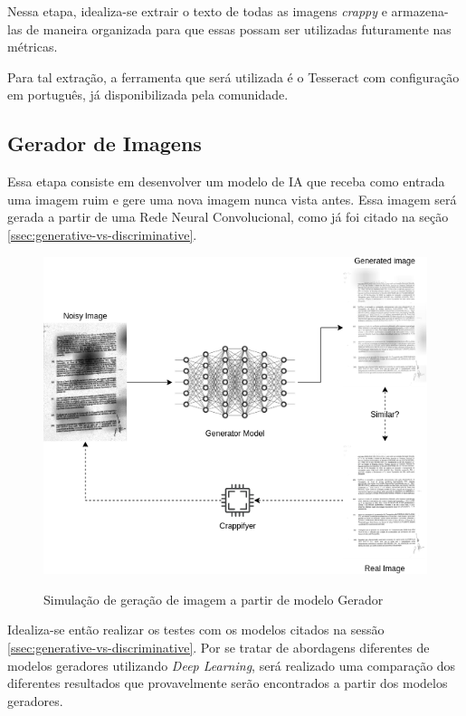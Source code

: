 Nessa etapa, idealiza-se extrair o texto de todas as imagens \textit{crappy} e armazena-las de maneira organizada para que essas possam ser utilizadas futuramente nas métricas.

Para tal extração, a ferramenta que será utilizada é o Tesseract com configuração em português, já disponibilizada pela comunidade.


\subsection{Gerador de Imagens}

Essa etapa consiste em desenvolver um modelo de IA que receba como entrada uma imagem ruim e gere uma nova imagem nunca vista antes. Essa imagem será gerada a partir de uma Rede Neural Convolucional, como já foi citado na seção \ref{ssec:generative-vs-discriminative}.

\begin{figure}[H]
  \centering
  \caption{Simulação de geração de imagem a partir de modelo Gerador}
  \includegraphics[scale=0.6]{figuras/image-generation.png}
  \label{fig:image-generation}
\end{figure}

Idealiza-se então realizar os testes com os modelos citados na sessão \ref{ssec:generative-vs-discriminative}. Por se tratar de abordagens diferentes de modelos geradores utilizando \textit{Deep Learning}, será realizado uma comparação dos diferentes resultados que provavelmente serão encontrados a partir dos modelos geradores.


